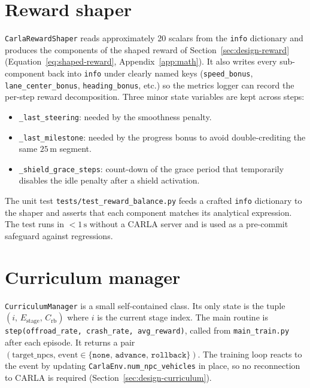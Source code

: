 \section{Reward shaper}\label{sec:impl-reward}

\texttt{CarlaRewardShaper} reads approximately 20 scalars from the \texttt{info} dictionary and
produces the components of the shaped reward of Section~\ref{sec:design-reward}
(Equation~\eqref{eq:shaped-reward}, Appendix~\ref{app:math}). It
also writes every sub-component back into \texttt{info} under clearly named keys
(\texttt{speed\_bonus}, \texttt{lane\_center\_bonus}, \texttt{heading\_bonus}, etc.) so the
metrics logger can record the per-step reward decomposition. Three minor state variables are kept
across steps:

\begin{itemize}
  \item \texttt{\_last\_steering}: needed by the smoothness penalty.
  \item \texttt{\_last\_milestone}: needed by the progress bonus to avoid double-crediting the
        same \(25\,\mathrm{m}\) segment.
  \item \texttt{\_shield\_grace\_steps}: count-down of the grace period that temporarily
        disables the idle penalty after a shield activation.
\end{itemize}

The unit test \texttt{tests/test\_reward\_balance.py} feeds a crafted \texttt{info} dictionary
to the shaper and asserts that each component matches its analytical expression. The test runs
in \(< 1\,\mathrm{s}\) without a CARLA server and is used as a pre-commit safeguard against
regressions.

\section{Curriculum manager}\label{sec:impl-curriculum}

\texttt{CurriculumManager} is a small self-contained class. Its only state is the tuple
\((i,\, E_{\mathrm{stage}},\, C_{\mathrm{rb}})\) where \(i\) is the current stage index. The
main routine is \texttt{step(offroad\_rate, crash\_rate, avg\_reward)}, called from
\texttt{main\_train.py} after each episode. It returns a pair
\((\text{target\_npcs},\, \text{event} \in \{\texttt{none},\, \texttt{advance},\, \texttt{rollback}\})\).
The training loop reacts to the event by updating \texttt{CarlaEnv.num\_npc\_vehicles} in place,
so no reconnection to CARLA is required (Section~\ref{sec:design-curriculum}).

